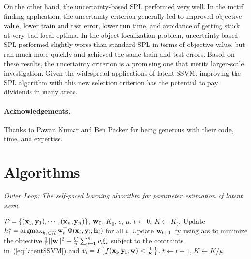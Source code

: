 \documentclass{article}
\newcommand{\mysection}[1]{\vspace{-4mm}\section{#1}\vspace{-4mm}}
\newcommand{\myparagraph}[1]{\vspace{-2mm}\paragraph{#1}}
\newcommand{\mytopcaption}[1]{\caption{\em \footnotesize #1}}
\newcommand{\argmax}{\operatornamewithlimits{argmax}}
\begin{document}
On the other hand, the uncertainty-based SPL performed very well. In the motif finding application, the uncertainty criterion generally led to improved objective value, lower train and test error, lower run time, and avoidance of getting stuck at very bad local optima. In the object localization problem, uncertainty-based SPL performed slightly worse than standard SPL in terms of objective value, but ran much more quickly and achieved the same train and test errors. Based on these results, the uncertainty criterion is a promising one that merits larger-scale investigation. Given the widespread applications of latent SSVM, improving the SPL algorithm with this new selection criterion has the potential to pay dividends in many areas. 

\myparagraph{Acknowledgements.}
Thanks to Pawan Kumar and Ben Packer for being generous with their code, time, and expertise.

\appendix

\newpage

\mysection{Algorithms}
\label{sec:algs}

\begin{algorithm}[h!]
\mytopcaption{Outer Loop: The self-paced learning algorithm for parameter estimation of latent {\sc ssvm}.}
\label{algo:selfPacedLatentSSVM}
\begin{algorithmic}[1]
\INPUT ${\cal D} = \{({\bf x}_1,{\bf y}_1),\cdots,({\bf x}_n,{\bf y}_n)\}$, ${\bf w}_0$, $K_0$, $\epsilon$, $\mu$.
\STATE $t \leftarrow 0$, $K \leftarrow K_0$.
\REPEAT
\STATE Update $h_i^* = \argmax_{h_i \in {\cal H}} {\bf w}_{t}^\top \Phi({\bf x}_i,{\bf y}_i,{\bf h}_i)$ for all $i$.
\STATE Update ${\bf w}_{t+1}$ by using {\sc acs} to minimize the objective
$\frac{1}{2}||{\bf w}||^2 + \frac{C}{n} \sum_{i=1}^n v_i\xi_i$ subject to the contraints in~(\ref{eq:latentSSVM}) and $v_i=I\left\{f({\bf x_i,\bf y_i;\bf w}) < \frac{1}{K}\right\}$.
\STATE $t \leftarrow t + 1$, $K \leftarrow K/\mu$.
\end{algorithmic}
\end{algorithm}
\end{document}

